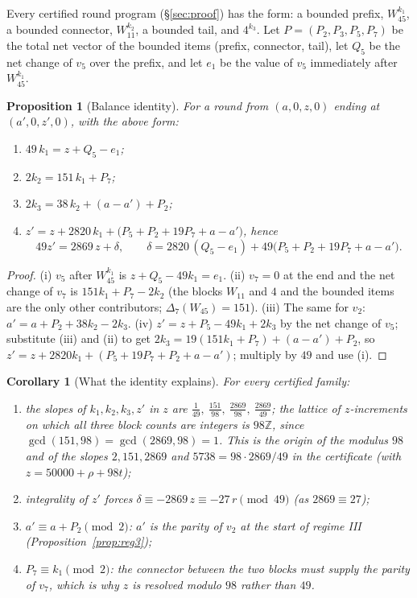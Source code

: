 \documentclass[11pt,a4paper]{article}
\newtheorem{proposition}[theorem]{Proposition}
\newtheorem{corollary}[theorem]{Corollary}
\theoremstyle{definition}
\newcommand{\Z}{\mathbb{Z}}
\newcommand{\Wa}{W_{45}}
\newcommand{\Wb}{W_{11}}
\begin{document}
Every certified round program (\S\ref{sec:proof}) has the form: a bounded prefix, $\Wa^{k_1}$, a bounded connector, $\Wb^{k_2}$, a bounded tail, and $4^{k_3}$. Let $P=(P_2,P_3,P_5,P_7)$ be the total net vector of the bounded items (prefix, connector, tail), let $Q_5$ be the net change of $v_5$ over the prefix, and let $e_1$ be the value of $v_5$ immediately after $\Wa^{k_1}$.

\begin{proposition}[Balance identity]\label{prop:balance}
For a round from $(a,0,z,0)$ ending at $(a',0,z',0)$, with the above form:
\begin{enumerate}[label=(\roman*)]
\item $49\,k_1=z+Q_5-e_1$;
\item $2k_2=151\,k_1+P_7$;
\item $2k_3=38\,k_2+(a-a')+P_2$;
\item $z'=z+2820\,k_1+\bigl(P_5+P_2+19P_7+a-a'\bigr)$, hence
\begin{equation}\label{eq:balance}
49z'=2869\,z+\delta,\qquad \delta=2820\,(Q_5-e_1)+49\bigl(P_5+P_2+19P_7+a-a'\bigr).
\end{equation}
\end{enumerate}
\end{proposition}
\begin{proof}
(i) $v_5$ after $\Wa^{k_1}$ is $z+Q_5-49k_1=e_1$. (ii) $v_7=0$ at the end and the net change of $v_7$ is $151k_1+P_7-2k_2$ (the blocks $\Wb$ and $4$ and the bounded items are the only other contributors; $\Delta_7(\Wa)=151$). (iii) The same for $v_2$: $a'=a+P_2+38k_2-2k_3$. (iv) $z'=z+P_5-49k_1+2k_3$ by the net change of $v_5$; substitute (iii) and (ii) to get $2k_3=19(151k_1+P_7)+(a-a')+P_2$, so $z'=z+2820k_1+(P_5+19P_7+P_2+a-a')$; multiply by $49$ and use (i).
\end{proof}

\begin{corollary}[What the identity explains]\label{cor:explains}
For every certified family:
\begin{enumerate}[label=(\alph*)]
\item the slopes of $k_1,k_2,k_3,z'$ in $z$ are $\tfrac1{49},\ \tfrac{151}{98},\ \tfrac{2869}{98},\ \tfrac{2869}{49}$; the lattice of $z$-increments on which all three block counts are integers is $98\Z$, since $\gcd(151,98)=\gcd(2869,98)=1$. This is the origin of the modulus $98$ and of the slopes $2,151,2869$ and $5738=98\cdot2869/49$ in the certificate (with $z=50000+\rho+98t$);
\item integrality of $z'$ forces $\delta\equiv-2869\,z\equiv-27\,r\pmod{49}$ (as $2869\equiv27$);
\item $a'\equiv a+P_2\pmod2$: $a'$ is the parity of $v_2$ at the start of regime III (Proposition~\ref{prop:reg3});
\item $P_7\equiv k_1\pmod 2$: the connector between the two blocks must supply the parity of $v_7$, which is why $z$ is resolved modulo $98$ rather than $49$.
\end{enumerate}
\end{corollary}
\end{document}
